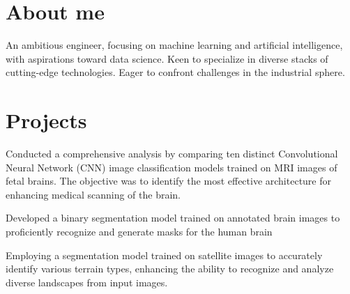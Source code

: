 \documentclass[]{BismayResume}
\begin{document}
\begin{minipage}[t]{0.70\textwidth} 

\section{About me}
\begin{tightemize}
\item An ambitious engineer, focusing on machine learning and artificial intelligence, with aspirations toward data science. Keen to specialize in diverse stacks of cutting-edge technologies. Eager to confront challenges in the industrial sphere.
\end{tightemize}
\sectionsep

\section{Projects}
\vspace{\topsep} %
\begin{tightemize}
\sectionsep
\item Conducted a comprehensive analysis by comparing ten distinct Convolutional Neural Network (CNN) image classification models trained on MRI images of fetal brains. The objective was to identify the most effective architecture for enhancing medical scanning of the brain.  
\end{tightemize}
\sectionsep


\begin{tightemize}
\sectionsep
\item Developed a binary segmentation model trained on annotated brain images to proficiently recognize and generate masks for the human brain

\end{tightemize}
\sectionsep

\begin{tightemize}
\sectionsep
\item Employing a segmentation model trained on satellite images to accurately identify various terrain types, enhancing the ability to recognize and analyze diverse landscapes from input images.


\end{tightemize}
\end{minipage}
\end{document}
